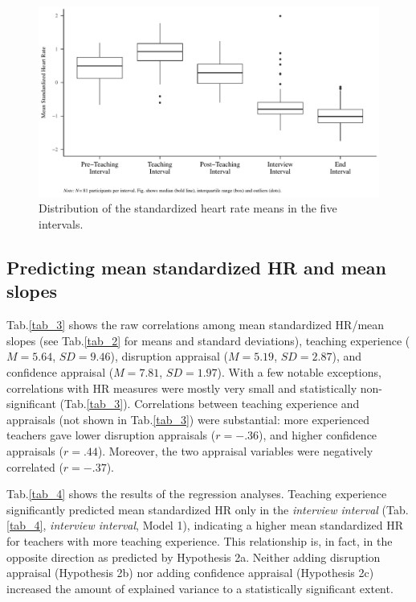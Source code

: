 \documentclass[preprint,
3p]{elsarticle} %
\begin{document}
\begin{figure}[H]
  \centering
  \includegraphics[width=1\textwidth]{plots_publication/box_plot.pdf}
  \caption{Distribution of the standardized heart rate means in the five intervals.}
  \label{fig.4}
\end{figure}

\subsection{Predicting mean standardized HR and mean
slopes}\label{predicting-mean-standardized-hr-and-mean-slopes}

Tab.\ref{tab_3} shows the raw correlations among mean standardized
HR/mean slopes (see Tab.\ref{tab_2} for means and standard deviations),
teaching experience (\(M = 5.64\), \(SD = 9.46\)), disruption appraisal
(\(M = 5.19\), \(SD = 2.87\)), and confidence appraisal (\(M = 7.81\),
\(SD = 1.97\)). With a few notable exceptions, correlations with HR
measures were mostly very small and statistically non-significant
(Tab.\ref{tab_3}). Correlations between teaching experience and
appraisals (not shown in Tab.\ref{tab_3}) were substantial: more
experienced teachers gave lower disruption appraisals (\(r = -.36\)),
and higher confidence appraisals (\(r = .44\)). Moreover, the two
appraisal variables were negatively correlated (\(r = -.37\)).

Tab.\ref{tab_4} shows the results of the regression analyses. Teaching
experience significantly predicted mean standardized HR only in the
\emph{interview interval} (Tab.\ref{tab_4}, \emph{interview interval},
Model 1), indicating a higher mean standardized HR for teachers with
more teaching experience. This relationship is, in fact, in the opposite
direction as predicted by Hypothesis 2a. Neither adding disruption
appraisal (Hypothesis 2b) nor adding confidence appraisal (Hypothesis
2c) increased the amount of explained variance to a statistically
significant extent.
\end{document}
